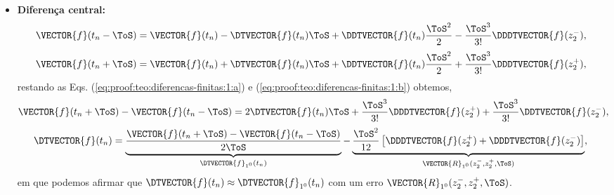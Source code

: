 \begin{myproofT}
\begin{itemize}
\item \textbf{Diferença central:} 
\begin{equation}\label{eq:proof:teo:diferencas-finitas:1:a}
\VECTOR{f}(t_n-\ToS) = \VECTOR{f}(t_n)-\DTVECTOR{f}(t_n)\ToS +\DDTVECTOR{f}(t_n) \frac{\ToS^2}{2}-\frac{\ToS^3}{3!}\DDDTVECTOR{f}(z_{2}^{-}),
\end{equation}
\begin{equation}\label{eq:proof:teo:diferencas-finitas:1:b}
\VECTOR{f}(t_n+\ToS) = \VECTOR{f}(t_n)+\DTVECTOR{f}(t_n)\ToS +\DDTVECTOR{f}(t_n) \frac{\ToS^2}{2}+\frac{\ToS^3}{3!}\DDDTVECTOR{f}(z_{2}^{+}),
\end{equation}
restando as Eqs. (\ref{eq:proof:teo:diferencas-finitas:1:a}) e (\ref{eq:proof:teo:diferencas-finitas:1:b}) obtemos,
\begin{equation}
\VECTOR{f}(t_n+\ToS) - \VECTOR{f}(t_n-\ToS) = 2\DTVECTOR{f}(t_n)\ToS +\frac{\ToS^3}{3!}\DDDTVECTOR{f}(z_{2}^{+}) + \frac{\ToS^3}{3!}\DDTVECTOR{f}(z_{2}^{-}),
\end{equation}
\begin{equation}
\DTVECTOR{f}(t_n) = \underbrace{\frac{\VECTOR{f}(t_n+\ToS) - \VECTOR{f}(t_n-\ToS)}{2\ToS}}_{\DTVECTOR{f}_{1^{0}}(t_n)} - 
\underbrace{\frac{\ToS^2}{12} \left[\DDDTVECTOR{f}(z_{2}^{+}) + \DDDTVECTOR{f}(z_{2}^{-})\right]}_{\VECTOR{R}_{1^{0}}(z_{2}^{-},z_{2}^{+},\ToS)},
\end{equation}
em que podemos afirmar que $\DTVECTOR{f}(t_n)\approx \DTVECTOR{f}_{1^{0}}(t_n)$ 
com um erro $\VECTOR{R}_{1^{0}}(z_{2}^{-},z_{2}^{+},\ToS)$.
\end{itemize}
\end{myproofT}
